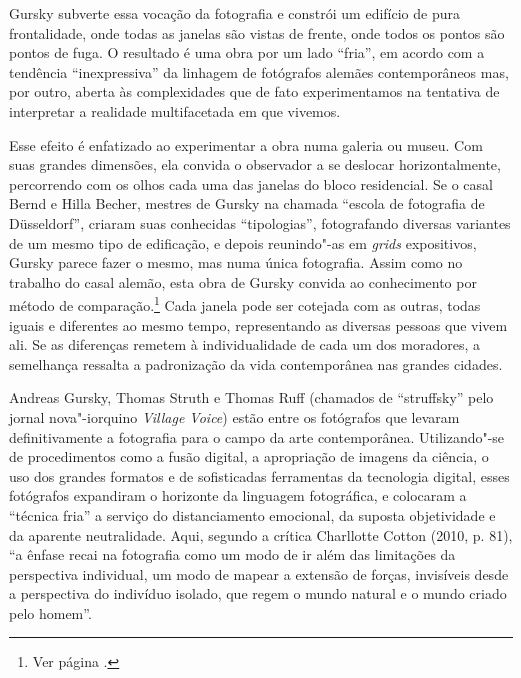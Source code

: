 Gursky subverte essa vocação da fotografia e constrói um edifício de
pura frontalidade, onde todas as janelas são vistas de frente, onde
todos os pontos são pontos de fuga. O resultado é uma obra por um lado
``fria'', em acordo com a tendência ``inexpressiva'' da linhagem de
fotógrafos alemães contemporâneos mas, por outro, aberta às
complexidades que de fato experimentamos na tentativa de interpretar a
realidade multifacetada em que vivemos.

Esse efeito é enfatizado ao experimentar a obra numa galeria ou museu.
Com suas grandes dimensões, ela convida o observador a se deslocar
horizontalmente, percorrendo com os olhos cada uma das janelas do bloco
residencial. Se o casal Bernd e Hilla Becher, mestres de Gursky na
chamada ``escola de fotografia de Düsseldorf'', criaram suas conhecidas
``tipologias'', fotografando diversas variantes de um mesmo tipo de
edificação, e depois reunindo"-as em \emph{grids} expositivos, Gursky
parece fazer o mesmo, mas numa única fotografia. Assim como no trabalho
do casal alemão, esta obra de Gursky convida ao conhecimento por método
de comparação.\footnote{Ver página \pageref{grid}.} Cada janela pode ser
cotejada com as outras, todas iguais e diferentes ao mesmo tempo,
representando as diversas pessoas que vivem ali. Se as diferenças
remetem à individualidade de cada um dos moradores, a semelhança
ressalta a padronização da vida contemporânea nas grandes cidades.

Andreas Gursky, Thomas Struth e Thomas Ruff (chamados de ``struffsky''
pelo jornal nova"-iorquino \emph{Village Voice}) estão entre os fotógrafos
que levaram definitivamente a fotografia para o campo da arte
contemporânea. Utilizando"-se de procedimentos como a fusão digital, a
apropriação de imagens da ciência, o uso dos grandes formatos e de
sofisticadas ferramentas da tecnologia digital, esses fotógrafos
expandiram o horizonte da linguagem fotográfica, e colocaram a ``técnica
fria'' a serviço do distanciamento emocional, da suposta objetividade e
da aparente neutralidade. Aqui, segundo a crítica Charllotte Cotton (2010, p. 81), ``a ênfase recai na fotografia como um modo de ir além
das limitações da perspectiva individual, um modo de mapear a extensão
de forças, invisíveis desde a perspectiva do indivíduo isolado, que
regem o mundo natural e o mundo criado pelo homem''.

